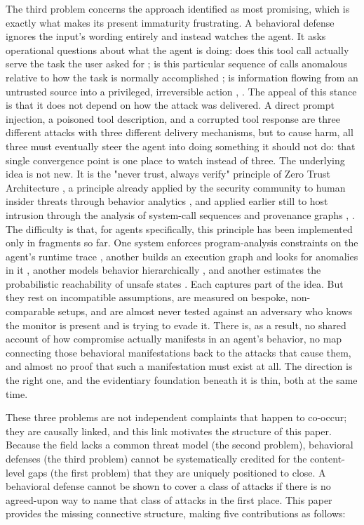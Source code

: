 \documentclass[journal]{IEEEtran}
\theoremstyle{remark}
\begin{document}
The third problem concerns the approach identified as most promising, which is exactly what makes its present immaturity frustrating. A behavioral defense ignores the input's wording entirely and instead watches the agent. It asks operational questions about what the agent is doing: does this tool call actually serve the task the user asked for \cite{r13}; is this particular sequence of calls anomalous relative to how the task is normally accomplished \cite{r14}; is information flowing from an untrusted source into a privileged, irreversible action \cite{r15}, \cite{r16}. The appeal of this stance is that it does not depend on how the attack was delivered. A direct prompt injection, a poisoned tool description, and a corrupted tool response are three different attacks with three different delivery mechanisms, but to cause harm, all three must eventually steer the agent into doing something it should not do: that single convergence point is one place to watch instead of three. The underlying idea is not new. It is the "never trust, always verify" principle of Zero Trust Architecture \cite{r17}, a principle already applied by the security community to human insider threats through behavior analytics \cite{r18}, and applied earlier still to host intrusion through the analysis of system-call sequences and provenance graphs \cite{r21}, \cite{r27}. The difficulty is that, for agents specifically, this principle has been implemented only in fragments so far. One system enforces program-analysis constraints on the agent's runtime trace \cite{r16}, another builds an execution graph and looks for anomalies in it \cite{r14}, another models behavior hierarchically \cite{r19}, and another estimates the probabilistic reachability of unsafe states \cite{r20}. Each captures part of the idea. But they rest on incompatible assumptions, are measured on bespoke, non-comparable setups, and are almost never tested against an adversary who knows the monitor is present and is trying to evade it. There is, as a result, no shared account of how compromise actually manifests in an agent's behavior, no map connecting those behavioral manifestations back to the attacks that cause them, and almost no proof that such a manifestation must exist at all. The direction is the right one, and the evidentiary foundation beneath it is thin, both at the same time.

These three problems are not independent complaints that happen to co-occur; they are causally linked, and this link motivates the structure of this paper. Because the field lacks a common threat model (the second problem), behavioral defenses (the third problem) cannot be systematically credited for the content-level gaps (the first problem) that they are uniquely positioned to close. A behavioral defense cannot be shown to cover a class of attacks if there is no agreed-upon way to name that class of attacks in the first place. This paper provides the missing connective structure, making five contributions as follows: 
\end{document}

